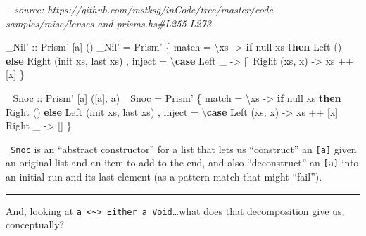 \documentclass[]{article}
\newenvironment{Shaded}{}{}
\newcommand{\CommentTok}[1]{\textcolor[rgb]{0.38,0.63,0.69}{\textit{#1}}}
\newcommand{\DataTypeTok}[1]{\textcolor[rgb]{0.56,0.13,0.00}{#1}}
\newcommand{\FunctionTok}[1]{\textcolor[rgb]{0.02,0.16,0.49}{#1}}
\newcommand{\KeywordTok}[1]{\textcolor[rgb]{0.00,0.44,0.13}{\textbf{#1}}}
\newcommand{\NormalTok}[1]{#1}
\newcommand{\OtherTok}[1]{\textcolor[rgb]{0.00,0.44,0.13}{#1}}
\begin{document}
\begin{Shaded}
\begin{Highlighting}[]
\CommentTok{-- source: https://github.com/mstksg/inCode/tree/master/code-samples/misc/lenses-and-prisms.hs#L255-L273}

\OtherTok{_Nil' ::} \DataTypeTok{Prism'}\NormalTok{ [a] ()}
\NormalTok{_Nil' }\FunctionTok{=} \DataTypeTok{Prism'}
\NormalTok{    \{ match  }\FunctionTok{=}\NormalTok{ \textbackslash{}xs }\OtherTok{->} \KeywordTok{if}\NormalTok{ null xs}
        \KeywordTok{then} \DataTypeTok{Left}\NormalTok{  ()}
        \KeywordTok{else} \DataTypeTok{Right}\NormalTok{ (init xs, last xs)}
\NormalTok{    , inject }\FunctionTok{=}\NormalTok{ \textbackslash{}}\KeywordTok{case}
        \DataTypeTok{Left}\NormalTok{ _        }\OtherTok{->}\NormalTok{ []}
        \DataTypeTok{Right}\NormalTok{ (xs, x) }\OtherTok{->}\NormalTok{ xs }\FunctionTok{++}\NormalTok{ [x]}
\NormalTok{    \}}

\OtherTok{_Snoc ::} \DataTypeTok{Prism'}\NormalTok{ [a] ([a], a)}
\NormalTok{_Snoc }\FunctionTok{=} \DataTypeTok{Prism'}
\NormalTok{    \{ match  }\FunctionTok{=}\NormalTok{ \textbackslash{}xs }\OtherTok{->} \KeywordTok{if}\NormalTok{ null xs}
        \KeywordTok{then} \DataTypeTok{Right}\NormalTok{ ()}
        \KeywordTok{else} \DataTypeTok{Left}\NormalTok{  (init xs, last xs)}
\NormalTok{    , inject }\FunctionTok{=}\NormalTok{ \textbackslash{}}\KeywordTok{case}
        \DataTypeTok{Left}\NormalTok{  (xs, x) }\OtherTok{->}\NormalTok{ xs }\FunctionTok{++}\NormalTok{ [x]}
        \DataTypeTok{Right}\NormalTok{ _       }\OtherTok{->}\NormalTok{ []}
\NormalTok{    \}}
\end{Highlighting}
\end{Shaded}

\texttt{\_Snoc} is an ``abstract constructor'' for a list that lets us
``construct'' an \texttt{{[}a{]}} given an original list and an item to add to
the end, and also ``deconstruct'' an \texttt{{[}a{]}} into an initial run and
its last element (as a pattern match that might ``fail'').

\begin{center}\rule{0.5\linewidth}{\linethickness}\end{center}

And, looking at
\texttt{a\ \textless{}\textasciitilde{}\textgreater{}\ Either\ a\ Void}\ldots{}what
does that decomposition give us, conceptually?
\end{document}
